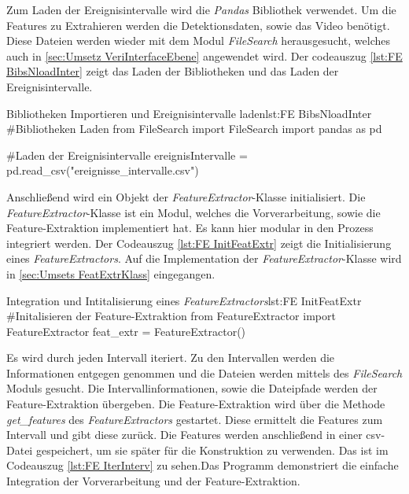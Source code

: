 
Zum Laden der Ereignisintervalle wird die \textit{Pandas} Bibliothek verwendet. Um die Features zu Extrahieren werden die Detektionsdaten, sowie das Video benötigt. Diese Dateien werden wieder mit dem Modul \textit{FileSearch} herausgesucht, welches auch in \ref{sec:Umsetz VeriInterfaceEbene} angewendet wird. Der codeauszug \ref{lst:FE BibsNloadInter} zeigt das Laden der Bibliotheken und das Laden der Ereignisintervalle.\par

\begin{pythoncode}{Bibliotheken Importieren und Ereignisintervalle laden}{lst:FE BibsNloadInter}
#Bibliotheken Laden
from FileSearch import FileSearch
import pandas as pd

#Laden der Ereignisintervalle
ereignisIntervalle = pd.read_csv("ereignisse_intervalle.csv")
\end{pythoncode}

Anschließend wird ein Objekt der \textit{FeatureExtractor}-Klasse initialisiert. Die \textit{FeatureExtractor}-Klasse ist ein Modul, welches die Vorverarbeitung, sowie die Feature-Extraktion implementiert hat. Es kann hier modular in den Prozess integriert werden. Der Codeauszug \ref{lst:FE InitFeatExtr} zeigt die Initialisierung eines \textit{FeatureExtractors}. Auf die Implementation der \textit{FeatureExtractor}-Klasse wird in \ref{sec:Umsets FeatExtrKlass} eingegangen.

\begin{pythoncode}{Integration und Intitalisierung eines \textit{FeatureExtractors}}{lst:FE InitFeatExtr}
#Initalisieren der Feature-Extraktion
from FeatureExtractor import FeatureExtractor
feat_extr = FeatureExtractor()
\end{pythoncode}

Es wird durch jeden Intervall iteriert. Zu den Intervallen werden die Informationen entgegen genommen und die Dateien werden mittels des \textit{FileSearch} Moduls gesucht. Die Intervallinformationen, sowie die Dateipfade werden der Feature-Extraktion übergeben. Die Feature-Extraktion wird über die Methode \textit{get\_features} des \textit{FeatureExtractors} gestartet. Diese ermittelt die Features zum Intervall und gibt diese zurück. Die Features werden anschließend in einer csv-Datei gespeichert, um sie später für die Konstruktion zu verwenden. Das ist im Codeauszug \ref{lst:FE IterInterv} zu sehen.Das Programm demonstriert die einfache Integration der Vorverarbeitung und der Feature-Extraktion. 

